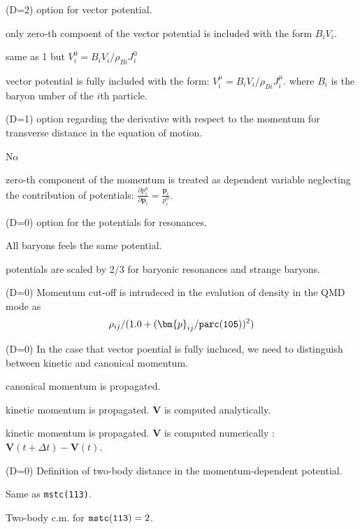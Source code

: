 \documentclass[]{article}
\newenvironment{entry}%
{\begin{list}{}{\setlength{\topsep}{0mm} \setlength{\itemsep}{0mm}
\setlength{\parskip}{0mm} \setlength{\parsep}{0mm}
\setlength{\leftmargin}{20mm} \setlength{\rightmargin}{0mm}
\setlength{\labelwidth}{18mm} \setlength{\labelsep}{2mm}}}%
{\end{list}}
\newenvironment{subentry}%
{\begin{list}{}{\setlength{\topsep}{0mm} \setlength{\itemsep}{0mm}
\setlength{\parskip}{0mm} \setlength{\parsep}{0mm}
\setlength{\leftmargin}{10mm} \setlength{\rightmargin}{0mm}
\setlength{\labelwidth}{18mm} \setlength{\labelsep}{2mm}}}%
{\end{list}}
\newcommand{\ttt}[1]{{\tt#1}}
\newcommand{\itemt}[1]{\item[{\tt #1}\hfill]}
\begin{document}
\begin{entry}
\itemt{mstc(115) :}(D=2) option for vector potential.
 \begin{subentry}
    \itemt{$=0$ :} only zero-th compoent of the vector potential is 
    included with the form $B_iV_i$.
    \itemt{$=1$ :} same as 1 but $V_i^0=B_iV_i/\rho_{Bi}J^0_i$
    \itemt{$=2$ :} vector potential is fully included with the form:
    $V^\mu_i = B_iV_i/\rho_{Bi}J_i^\mu$.
    where $B_i$ is the baryon umber of the $i$th particle.
 \end{subentry}

\itemt{mstc(116) :}(D=1) option regarding the derivative with respect to
the momentum for transverse distance in the equation of motion.
 \begin{subentry}
    \itemt{$=0$ :} No
    \itemt{$=1$ :} zero-th component of the momentum is treated
    as dependent variable neglecting the contribution of potentials:
    $\frac{\partial p_i^0}{\partial\bm{p}_i}=\frac{\bm{p}_i}{p_i^0}$.
 \end{subentry}

\itemt{mstc(117) :}(D=0) option for the potentials for resonances.
 \begin{subentry}
    \itemt{$=0$ :} All baryons feels the same potential.
    \itemt{$=1$ :} potentials are scaled by 2/3 for baryonic resonances 
      and strange baryons.
 \end{subentry}

\itemt{mstc(118) :}(D=0) Momentum cut-off is intrudeced
in the evalution of density in the QMD mode as
$$\rho_{ij}/(1.0 + (\bm{p}_{ij}/\ttt{parc(105)})^2)$$

\itemt{mstc(119) :}(D=0) In the case that vector poential is fully incluced,
we need to distinguish between kinetic and canonical momentum.
 \begin{subentry}
    \itemt{$=0$ :} canonical momentum is propagated.
    \itemt{$=1$ :} kinetic momentum is propagated. $\bm{\dot{V}}$
      is computed analytically.
    \itemt{$=2$ :} kinetic momentum is propagated. $\bm{\dot{V}}$
    is computed numerically : 
    $\bm{V}(t+\Delta t)-\bm{V}(t)$.
 \end{subentry}


\itemt{mstc(120) :}(D=0) Definition of two-body distance in the
momentum-dependent potential.
 \begin{subentry}
    \itemt{$=0$ :} Same as \ttt{mstc(113)}.
    \itemt{$=1$ :} Two-body c.m. for $\ttt{mstc(113)}=2$.
 \end{subentry}


\end{entry}
\end{document}
